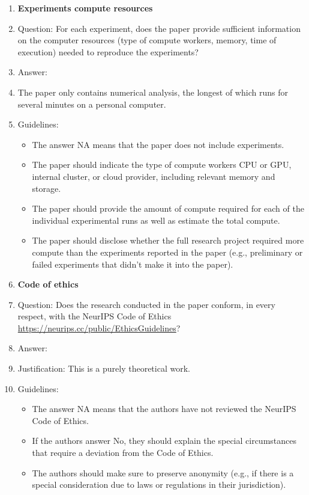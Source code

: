\documentclass{article}
\theoremstyle{plain}
\theoremstyle{definition}
\begin{document}
\begin{enumerate}
\item {\bf Experiments compute resources}
    \item[] Question: For each experiment, does the paper provide sufficient information on the computer resources (type of compute workers, memory, time of execution) needed to reproduce the experiments?
    \item[] Answer: \answerNA{}
    \item[] The paper only contains numerical analysis, the longest of which runs for several minutes on a personal computer.
    \item[] Guidelines:
    \begin{itemize}
        \item The answer NA means that the paper does not include experiments.
        \item The paper should indicate the type of compute workers CPU or GPU, internal cluster, or cloud provider, including relevant memory and storage.
        \item The paper should provide the amount of compute required for each of the individual experimental runs as well as estimate the total compute. 
        \item The paper should disclose whether the full research project required more compute than the experiments reported in the paper (e.g., preliminary or failed experiments that didn't make it into the paper). 
    \end{itemize}
    
\item {\bf Code of ethics}
    \item[] Question: Does the research conducted in the paper conform, in every respect, with the NeurIPS Code of Ethics \url{https://neurips.cc/public/EthicsGuidelines}?
    \item[] Answer: \answerYes{}
    \item[] Justification: This is a purely theoretical work.
    \item[] Guidelines:
    \begin{itemize}
        \item The answer NA means that the authors have not reviewed the NeurIPS Code of Ethics.
        \item If the authors answer No, they should explain the special circumstances that require a deviation from the Code of Ethics.
        \item The authors should make sure to preserve anonymity (e.g., if there is a special consideration due to laws or regulations in their jurisdiction).
    \end{itemize}


\end{enumerate}
\end{document}
